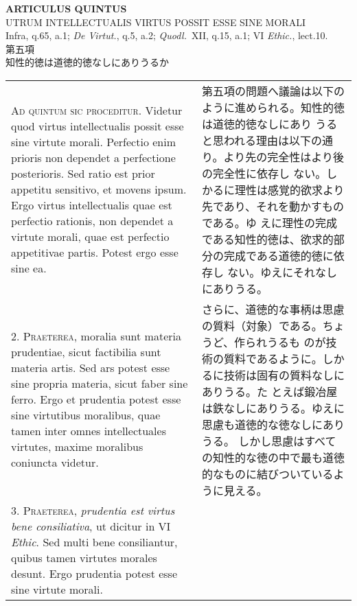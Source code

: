 \documentclass[10pt]{jsarticle}
\begin{document}
\begin{center}
{\Large {\bf ARTICULUS QUINTUS}}\\
{\large UTRUM INTELLECTUALIS VIRTUS POSSIT ESSE SINE MORALI}\\
{\footnotesize Infra, q.65, a.1; {\itshape De Virtut.}, q.5, a.2; {\itshape Quodl.}~XII, q.15, a.1; VI {\itshape Ethic.}, lect.10.}\\
{\Large 第五項\\知性的徳は道徳的徳なしにありうるか}
\end{center}

\begin{longtable}{p{21em}p{21em}}
{\scshape Ad quintum sic proceditur}. Videtur quod virtus
intellectualis possit esse sine virtute morali. Perfectio enim prioris
non dependet a perfectione posterioris. Sed ratio est prior appetitu
sensitivo, et movens ipsum. Ergo virtus intellectualis quae est
perfectio rationis, non dependet a virtute morali, quae est perfectio
appetitivae partis. Potest ergo esse sine ea.


&

第五項の問題へ議論は以下のように進められる。知性的徳は道徳的徳なしにあり
うると思われる理由は以下の通り。より先の完全性はより後の完全性に依存し
ない。しかるに理性は感覚的欲求より先であり、それを動かすものである。ゆ
えに理性の完成である知性的徳は、欲求的部分の完成である道徳的徳に依存し
ない。ゆえにそれなしにありうる。

\\



2. {\scshape Praeterea}, moralia sunt materia prudentiae, sicut
factibilia sunt materia artis. Sed ars potest esse sine propria
materia, sicut faber sine ferro. Ergo et prudentia potest esse sine
virtutibus moralibus, quae tamen inter omnes intellectuales virtutes,
maxime moralibus coniuncta videtur.

&

さらに、道徳的な事柄は思慮の質料（対象）である。ちょうど、作られうるも
のが技術の質料であるように。しかるに技術は固有の質料なしにありうる。た
とえば鍛冶屋は鉄なしにありうる。ゆえに思慮も道徳的な徳なしにありうる。
しかし思慮はすべての知性的な徳の中で最も道徳的なものに結びついているよ
うに見える。

\\



3. {\scshape Praeterea}, {\itshape prudentia est virtus bene
consiliativa}, ut dicitur in VI {\itshape Ethic}. Sed multi bene
consiliantur, quibus tamen virtutes morales desunt. Ergo prudentia
potest esse sine virtute morali.


\end{longtable}
\end{document}
